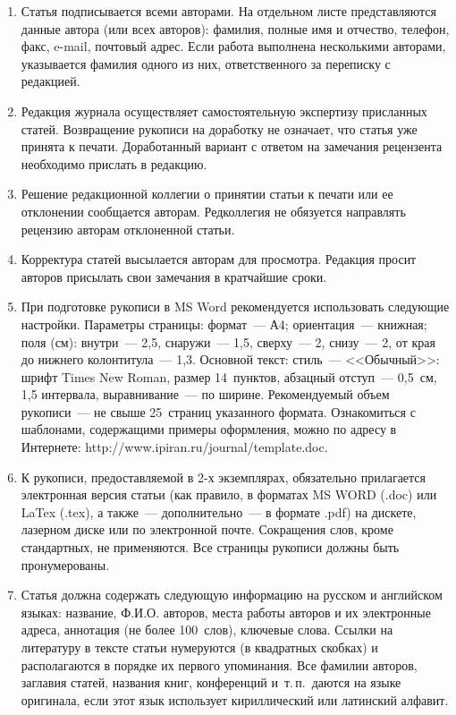 {{\begin{enumerate}
\item Статья
подписывается всеми авторами. На отдельном листе представляются данные автора
(или всех авторов): фамилия, полные имя и отчество, телефон, факс, e-mail,
почтовый адрес. Если работа выполнена несколькими авторами, указывается фамилия
одного из них, ответственного за переписку с редакцией.
\item Редакция журнала
осуществляет самостоятельную экспертизу присланных статей. Возвращение рукописи
на доработку не означает, что статья уже принята к печати. Доработанный вариант
с ответом на замечания рецензента необходимо прислать в редакцию.
\item Решение
редакционной коллегии о принятии статьи к печати или ее отклонении сообщается
авторам. Редколлегия не обязуется направлять рецензию авторам отклоненной
статьи.
\item Корректура статей высылается авторам для просмотра. Редакция
просит авторов присылать свои замечания в кратчайшие сроки.
\item При
подготовке рукописи в MS Word рекомендуется использовать следующие настройки.
Параметры страницы: формат~--- А4; ориентация~--- книжная; поля (см): внутри~---
2,5, снаружи~--- 1,5, сверху~--- 2, снизу~--- 2, от края до нижнего
колонтитула~--- 1,3. Основной текст: стиль~--- <<Обычный>>: шрифт Times New
Roman, размер 14~пунктов, абзацный отступ~--- 0,5~см, 1,5 интервала,
выравнивание~--- по ширине. Рекомендуемый объем рукописи~--- не свыше
25~страниц указанного формата. Ознакомиться с шаблонами, содержащими примеры
оформления, можно по адресу в Интернете:
\textsf{http://www.ipiran.ru/journal/template.doc}.
\item К рукописи, предоставляемой в 2-х
экземплярах, обязательно прилагается электронная версия статьи (как правило, в
форматах MS WORD (.doc) или LaTex (.tex), а также~--- дополнительно~--- в
формате .pdf) на дискете, лазерном диске или по электронной почте. Сокращения
слов, кроме стандартных, не применяются. Все страницы рукописи должны быть
пронумерованы.
\item Статья должна содержать следующую информацию на русском и
английском языках: название, Ф.И.О. авторов, места работы авторов и их
электронные адреса, аннотация (не более 100~слов), ключевые слова. Ссылки на
литературу в тексте статьи нумеруются (в квадратных скобках) и располагаются в
порядке их первого упоминания. Все фамилии авторов, заглавия статей, названия
книг, конференций и~т.\,п.\ даются на языке оригинала, если этот язык
использует кириллический или латинский алфавит.

\end{enumerate}}}
